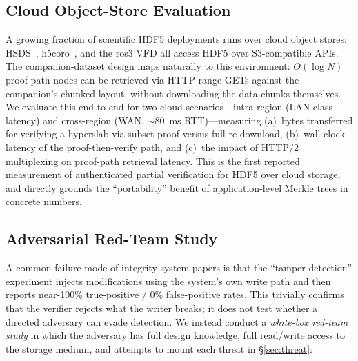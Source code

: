 \documentclass[11pt]{article}
\begin{document}
\subsection{Cloud Object-Store Evaluation}
\label{sec:cloud-eval}

A growing fraction of scientific HDF5 deployments runs over cloud object
stores: HSDS~\cite{hsds}, h5coro~\cite{h5coro}, and the ros3 VFD all access
HDF5 over S3-compatible APIs. The companion-dataset design maps naturally to
this environment: $O(\log N)$ proof-path nodes can be retrieved via
HTTP range-GETs against the companion's chunked layout, without downloading
the data chunks themselves. We evaluate this end-to-end for two cloud
scenarios---intra-region (LAN-class latency) and cross-region (WAN, $\sim$80~ms
RTT)---measuring (a)~bytes transferred for verifying a hyperslab via subset
proof versus full re-download, (b)~wall-clock latency of the proof-then-verify
path, and (c)~the impact of HTTP/2 multiplexing on proof-path retrieval
latency. This is the first reported measurement of authenticated partial
verification for HDF5 over cloud storage, and directly grounds the
``portability'' benefit of application-level Merkle trees in concrete numbers.

\subsection{Adversarial Red-Team Study}
\label{sec:adversarial}

A common failure mode of integrity-system papers is that the ``tamper
detection'' experiment injects modifications using the system's own
write path and then reports near-100\% true-positive / 0\% false-positive
rates. This trivially confirms that the verifier rejects what the writer
breaks; it does not test whether a directed adversary can evade detection.
We instead conduct a \emph{white-box red-team study} in which the adversary
has full design knowledge, full read/write access to the storage medium, and
attempts to mount each threat in \S\ref{sec:threat}:
\end{document}

